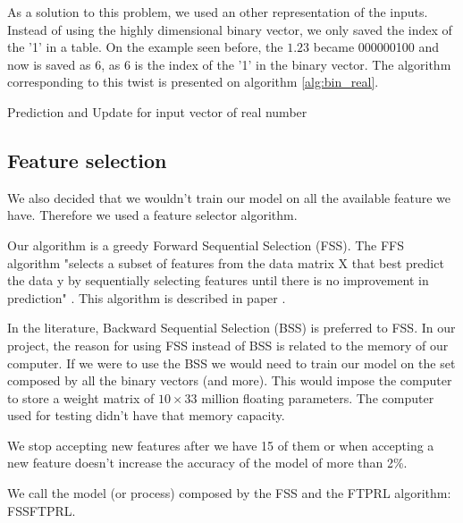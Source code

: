 		As a solution to this problem, we used an other representation of the inputs. Instead of using the highly dimensional binary vector, we only saved the index of the '1' in a table. On the example seen before, the $1.23$ became 000000100 and now is saved as 6, as 6 is the index of the '1' in the binary vector. The algorithm corresponding to this twist is presented on algorithm \ref{alg:bin_real}.

		\begin{algorithm}[H]

			\caption{Prediction and Update for input vector of real number}
			\label{alg:bin_real}
		\end{algorithm}


	\subsection{Feature selection}
		We also decided that we wouldn't train our model on all the available feature we have. Therefore we used a feature selector algorithm. 

		Our algorithm is a greedy Forward Sequential Selection (FSS). The FFS algorithm "selects a subset of features from the data matrix X that best predict the data y by sequentially selecting features until there is no improvement in prediction" \cite{matlab_fss}. This algorithm is described in paper \cite{aha1996comparative}.

		In the literature, Backward Sequential Selection (BSS) is preferred to FSS. In our project, the reason for using FSS instead of BSS is related to the memory of our computer. If we were to use the BSS we would need to train our model on the set composed by all the binary vectors (and more). This would impose the computer to store a weight matrix of $10 \times 33$ million floating parameters. The computer used for testing didn't have that memory capacity. 

		We stop accepting new features after we have 15 of them or when accepting a new feature doesn't increase the accuracy of the model of more than 2\%.

		We call the model (or process) composed by the FSS and the FTPRL algorithm: FSSFTPRL.

		


